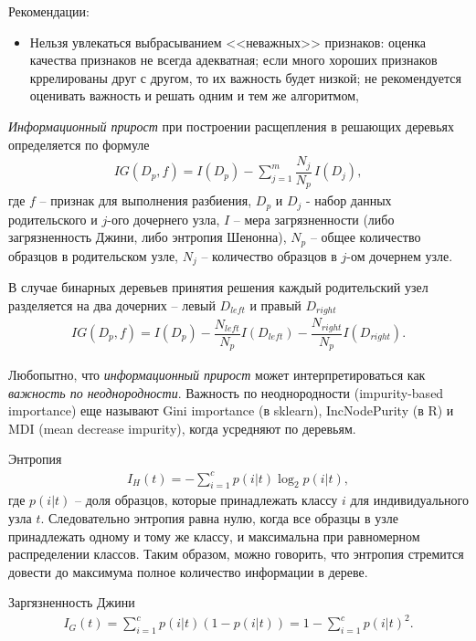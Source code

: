 \documentclass[%
	11pt,
	a4paper,
	utf8,
		]{article}
\begin{document}
Рекомендации:
\begin{itemize}
	\item Нельзя увлекаться выбрасыванием <<неважных>> признаков: оценка качества признаков не всегда адекватная; если много хороших признаков кррелированы друг с другом, то их важность будет низкой; не рекомендуется оценивать важность и решать одним и тем же алгоритмом,
	
	
\end{itemize}


\emph{Информационный прирост} при построении расщепления в решающих деревьях определяется по формуле \cite[122]{raschka:2019}
\begin{align*}
	IG(D_p, f) = I(D_p) - \sum_{j = 1}^{m} \dfrac{N_j}{N_p}\,I(D_j),
\end{align*}
где $ f $ -- признак для выполнения разбиения, $ D_p $ и $ D_j $ - набор данных родительского и $ j $-ого дочернего узла, $ I $ -- мера загрязненности (либо загрязненность Джини, либо энтропия Шенонна), $ N_p $ -- общее количество образцов в родительском узле, $ N_j $ -- количество образцов в $ j $-ом дочернем узле.

В случае бинарных деревьев принятия решения каждый родительский узел разделяется на два дочерних -- левый $ D_{left} $ и правый $ D_{right} $
\begin{align*}
	IG(D_p, f) = I(D_p) - \dfrac{N_{left}}{N_p} I(D_{left}) - \dfrac{N_{right}}{N_p} I(D_{right}).
\end{align*}

Любопытно, что \emph{информационный прирост} может интерпретироваться как \emph{важность по неоднородности}. Важность по неоднородности (impurity-based importance) еще называют Gini importance (в sklearn), IncNodePurity (в R) и MDI (mean decrease impurity), когда усредняют по деревьям.

Энтропия
\begin{align*}
	I_H(t) = - \sum_{i=1}^{c} p(i|t) \log_2 p(i|t),
\end{align*}
где $ p(i|t) $ -- доля образцов, которые принадлежать классу $ i $ для индивидуального узла $ t $. Следовательно энтропия равна нулю, когда все образцы в узле принадлежать одному и тому же классу, и максимальна при равномерном распределении классов. Таким образом, можно говорить, что энтропия стремится довести до максимума полное количество информации в дереве.

Заргязненность Джини
\begin{align*}
	I_G(t) = \sum_{i=1}^{c} p(i|t)(1 - p(i|t)) = 1 - \sum_{i=1}^{c} p(i|t)^2.
\end{align*}
\end{document}
